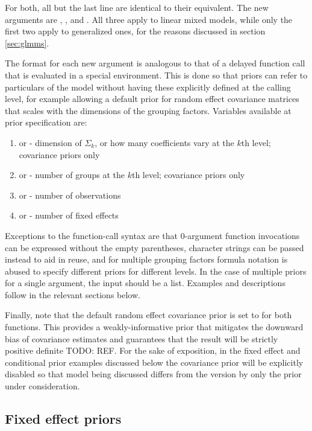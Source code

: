 \documentclass[article,shortnames]{jss}
\newcommand{\TODO}[1]{{\color{red} TODO: #1}}
\begin{document}
\noindent For both, all but the last line are identical to their
 equivalent. The new arguments are
, , and . All
three apply to linear mixed models, while only the first two apply to
generalized ones, for the reasons discussed in section \ref{sec:glmms}.

The format for each new argument is analogous to that of a delayed
function call that is evaluated in a special environment. This is done so 
that priors can refer to particulars of the model without having these
explicitly defined at the calling level, for example allowing a default prior for random effect covariance
matrices that scales with the dimensions of the grouping
factors. Variables available at prior specification are:

\begin{enumerate}
\item {} or  - dimension of $\Sigma_k$, or how many
  coefficients vary at the $k$th level; covariance priors only
  \item {} or  - number of groups at the
  $k$th level; covariance priors only
\item {} or  - number of observations
\item {} or  - number of fixed effects
\end{enumerate}

Exceptions to the function-call syntax are that 0-argument function invocations
can be expressed without the empty \code{()} parentheses, character
strings can be passed instead to aid in reuse, and for
multiple grouping factors  formula notation is abused to
specify different priors for different levels. In the case of multiple
priors for a single argument, the input should be a list. Examples and
descriptions follow in the relevant sections below.

Finally, note that the default random effect covariance prior is set
to  for both functions. This provides a
weakly-informative prior that mitigates the downward bias of
covariance estimates and guarantees that the result will be strictly
positive definite \TODO{REF}. For the sake of exposition, in the fixed effect and
conditional prior examples discussed below the covariance prior will be explicitly
disabled so that model being discussed differs from the 
version by only the prior under consideration.

\subsection{Fixed effect priors}
\label{sec:blme:fixefPriors}
\end{document}
